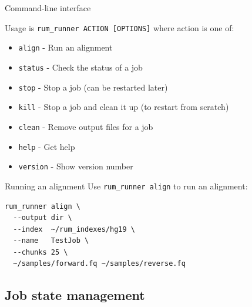 \documentclass{beamer}
\begin{document}
\begin{frame}{Command-line interface}

  Usage is \texttt{rum\_runner ACTION [OPTIONS]} where action is one of:

  \begin{itemize}
  \item \texttt{align} - Run an alignment
  \item \texttt{status} - Check the status of a job
  \item \texttt{stop} - Stop a job (can be restarted later)
  \item \texttt{kill} - Stop a job and clean it up (to restart from scratch)
  \item \texttt{clean} - Remove output files for a job
  \item \texttt{help} - Get help
  \item \texttt{version} - Show version number
  \end{itemize}

\end{frame}

\begin{frame}[fragile]{Running an alignment}
Use \texttt{rum\_runner align} to run an alignment:
\begin{verbatim}
rum_runner align \
  --output dir \
  --index  ~/rum_indexes/hg19 \
  --name   TestJob \
  --chunks 25 \
  ~/samples/forward.fq ~/samples/reverse.fq
\end{verbatim}
\end{frame}

\subsection{Job state management}
\end{document}
